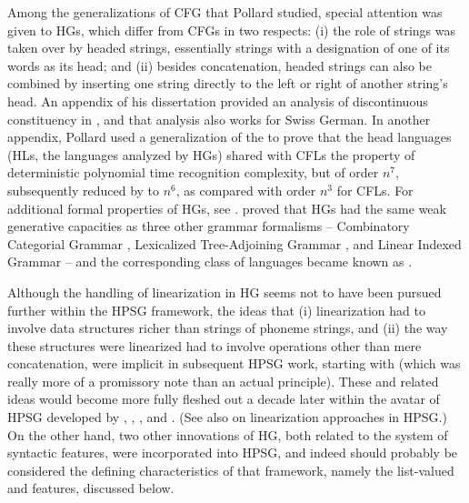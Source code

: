 \documentclass[output=paper
 	        ,biblatex
                ,babelshorthands
                ,newtxmath
                ,draftmode
                ,colorlinks, citecolor=brown
]{langscibook}
\begin{document}
Among the generalizations of CFG that Pollard studied, special attention was given to HGs, which differ from CFGs in two respects: (i) the role of strings was taken over by headed strings, essentially strings with a designation of one of its words as its head; and (ii) besides concatenation, headed strings can also be combined by inserting one string directly to the left or right of another string's head. An appendix of his dissertation \citep[Appendix~1]{Pollard84a-u} provided an analysis of discontinuous constituency in , and that analysis also works for Swiss German. In another appendix, Pollard used a generalization of the  to prove that the head languages (HLs, the languages analyzed by HGs) shared with CFLs the property of deterministic polynomial time recognition complexity, but of order $n^{7}$, subsequently reduced by \citet*{Kasamietal1989} to $n^{6}$, as compared with order $n^{3}$ for CFLs. For additional formal properties of HGs, see \citet{Roach1987}. \citet{VijayWeir1994} proved that HGs had the same weak generative capacities as three other grammar formalisms -- Combinatory Categorial Grammar \citep{Steedman87a-u,Steedman90a-u}, Lexicalized Tree-Adjoining Grammar \citep{Shabes90}, and Linear Indexed Grammar \citep{Gazdar88a-u} -- and the corresponding class of languages became known as \emph{}.

Although the handling of linearization in HG seems not to have been pursued further within the HPSG framework, the ideas that (i) linearization had to involve data structures richer than strings of phoneme strings, and (ii) the way these structures were linearized had to involve operations other than mere concatenation, were implicit in subsequent HPSG work, starting with   (which was really more of a promissory note than an actual principle).  These and related ideas would become more fully fleshed out a decade later within the  avatar of HPSG developed by \citet{Reape90a}, \citet{Reape92a}, \citet{Kathol95a,Kathol2000a}, and \citet{Mueller95c,Babel,Mueller99a,Mueller2004b}. (See also  on linearization approaches in HPSG.) On the other hand, two other innovations of HG, both related to the system of syntactic features, were incorporated into HPSG, and indeed should probably be considered the defining characteristics of that framework, namely the list-valued \subcat and \slasch features, discussed below.
\end{document}
